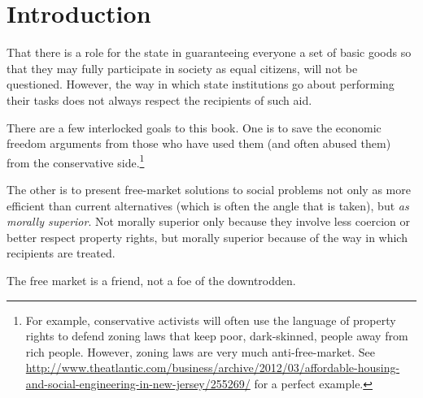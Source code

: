 \chapter{Introduction}

That there is a role for the state in guaranteeing everyone a set of basic
goods so that they may fully participate in society as equal citizens, will not
be questioned. However, the way in which state institutions go about performing
their tasks does not always respect the recipients of such aid.

There are a few interlocked goals to this book. One is to save the economic
freedom arguments from those who have used them (and often abused them) from
the conservative side.\footnote{For example, conservative activists will often
use the language of property rights to defend zoning laws that keep poor,
dark-skinned, people away from rich people. However, zoning laws are very much
anti-free-market. See
\url{http://www.theatlantic.com/business/archive/2012/03/affordable-housing-and-social-engineering-in-new-jersey/255269/} for a perfect example.} %

The other is to present free-market solutions to social problems not only as
more efficient than current alternatives (which is often the angle that is
taken), but \emph{as morally superior}. Not morally superior only because they
involve less coercion or better respect property rights, but morally superior
because of the way in which recipients are treated.

The free market is a friend, not a foe of the downtrodden.


